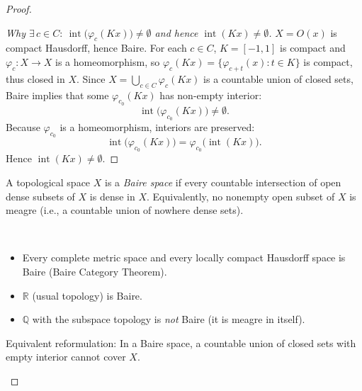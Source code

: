 \begin{proof}
\begin{mynote}
        \begin{proof}[Why $\exists\,c\in C:\ \operatorname{int}\bigl(\varphi_c(Kx)\bigr)\neq\emptyset$ and hence $\operatorname{int}(Kx)\neq\emptyset$]
            $X=O(x)$ is compact Hausdorff, hence Baire. For each $c\in C$, $K=[-1,1]$ is compact and
            $\varphi_c: X\to X$ is a homeomorphism, so $\varphi_c(Kx)=\{\varphi_{c+t}(x):t\in K\}$ is compact, thus closed in $X$.
            Since $X=\bigcup_{c\in C}\varphi_c(Kx)$ is a countable union of closed sets, Baire implies that some
            $\varphi_{c_0}(Kx)$ has non-empty interior:
            \[
                \operatorname{int}\bigl(\varphi_{c_0}(Kx)\bigr)\neq\emptyset.
            \]
            Because $\varphi_{c_0}$ is a homeomorphism, interiors are preserved:
            \[
                \operatorname{int}\bigl(\varphi_{c_0}(Kx)\bigr)=\varphi_{c_0}\!\bigl(\operatorname{int}(Kx)\bigr).
            \]
            Hence $\operatorname{int}(Kx)\neq\emptyset$.
        \end{proof}
        \begin{definition}
            A topological space $X$ is a \emph{Baire space} if every countable intersection of open dense subsets of $X$ is dense in $X$.
            Equivalently, no nonempty open subset of $X$ is meagre (i.e., a countable union of nowhere dense sets).
        \end{definition}

        \begin{examples*}~
            \begin{itemize}
                \item Every complete metric space and every locally compact Hausdorff space is Baire (Baire Category Theorem).
                \item $\mathbb{R}$ (usual topology) is Baire.
                \item $\mathbb{Q}$ with the subspace topology is \emph{not} Baire (it is meagre in itself).
            \end{itemize}
        \end{examples*}

        \begin{remark*}
            Equivalent reformulation: In a Baire space, a countable union of closed sets with empty interior cannot cover $X$.
        \end{remark*}
    \end{mynote}


\end{proof}
